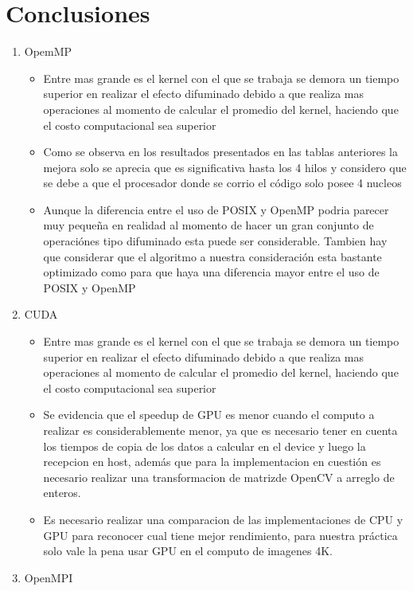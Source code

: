 \documentclass{IEEEtran}
\begin{document}
\section{Conclusiones}
\begin{enumerate}
    \item OpemMP
            \begin{itemize}
          \item Entre mas grande es el kernel con el que se trabaja se demora un tiempo superior en realizar el efecto difuminado debido a que realiza mas operaciones al momento de calcular el promedio del kernel, haciendo que el costo computacional sea superior
          \item Como se observa en los resultados presentados en las tablas anteriores la mejora solo se aprecia que es significativa hasta los 4 hilos y considero que se debe a que el procesador donde se corrio el código  solo posee 4
          nucleos
          \item Aunque la diferencia entre el uso de POSIX y OpenMP podria parecer muy pequeña en realidad al momento de hacer un gran conjunto de  operaciónes tipo  difuminado esta puede ser considerable. Tambien hay que considerar que el algoritmo a nuestra consideración esta bastante optimizado como para que haya una diferencia mayor entre el uso de POSIX y OpenMP
        \end{itemize}
         
    \item CUDA
    
         \begin{itemize}
          \item Entre mas grande es el kernel con el que se trabaja se demora un tiempo superior en realizar el efecto difuminado debido a que realiza mas operaciones al momento de calcular el promedio del kernel, haciendo que el costo computacional sea superior
          \item Se evidencia que el speedup de GPU es menor cuando el computo a realizar es considerablemente menor, ya que es necesario tener en cuenta los tiempos de copia de los datos a calcular en el device y luego la recepcion en host, además que para la implementacion en cuestión es necesario realizar una transformacion de matrizde OpenCV a arreglo de enteros.
          \item Es necesario realizar una comparacion de las implementaciones de CPU y GPU para reconocer cual tiene mejor rendimiento, para nuestra práctica solo vale la pena usar GPU en el computo de imagenes 4K.
        \end{itemize} 
    \item OpenMPI
\end{enumerate}
\end{document}
